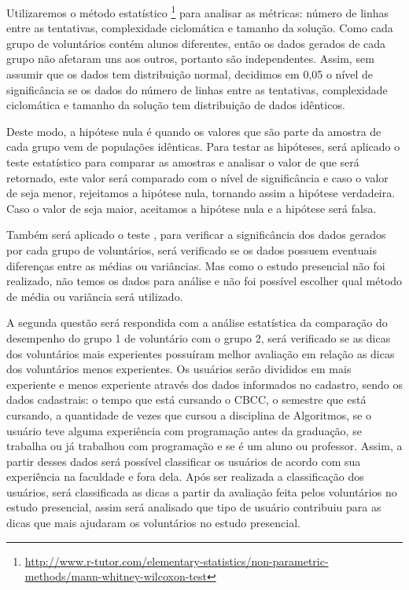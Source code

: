 Utilizaremos o método estatístico \footnote{\url{http://www.r-tutor.com/elementary-statistics/non-parametric-methods/mann-whitney-wilcoxon-test}} para analisar as métricas: número de linhas entre as tentativas, complexidade ciclomática e tamanho da solução. Como cada grupo de voluntários contém alunos diferentes, então os dados gerados de cada grupo não afetaram uns aos outros, portanto são independentes. Assim, sem assumir que os dados tem distribuição normal, decidimos em 0,05 o nível de significância se os dados do número de linhas entre as tentativas, complexidade ciclomática e tamanho da solução tem distribuição de dados idênticos. 

Deste modo, a hipótese nula é quando os valores que são parte da amostra de cada grupo vem de populações idênticas. Para testar as hipóteses, será aplicado o teste estatístico para comparar as amostras e analisar o valor de  que será retornado, este valor será comparado com o nível de significância e caso o valor de  seja menor, rejeitamos a hipótese nula, tornando assim a hipótese verdadeira. Caso o valor de  seja maior, aceitamos a hipótese nula e a hipótese será falsa. 

Também será aplicado o teste  \cite{macbeth2011cliff}, para verificar a significância dos dados gerados por cada grupo de voluntários, será verificado se os dados possuem eventuais diferenças entre as médias ou variâncias. Mas como o estudo presencial não foi realizado, não temos os dados para análise e não foi possível escolher qual método de média ou variância será utilizado.

A segunda questão será respondida com a análise estatística da comparação do desempenho do grupo 1 de voluntário com o grupo 2, será verificado se as dicas dos voluntários mais experientes possuíram melhor avaliação em relação as dicas dos voluntários menos experientes. Os usuários serão divididos em mais experiente e menos experiente através dos dados informados no cadastro, sendo os dados cadastrais: o tempo que está cursando o CBCC, o semestre que está cursando, a quantidade de vezes que cursou a disciplina de Algoritmos, se o usuário teve alguma experiência com programação antes da graduação, se trabalha ou já trabalhou com programação e se é um aluno ou professor. Assim, a partir desses dados será possível classificar os usuários de acordo com sua experiência na faculdade e fora dela. Após ser realizada a classificação dos usuários, será classificada as dicas a partir da avaliação feita pelos voluntários no estudo presencial, assim será analisado que tipo de usuário contribuiu para as dicas que mais ajudaram os voluntários no estudo presencial.
